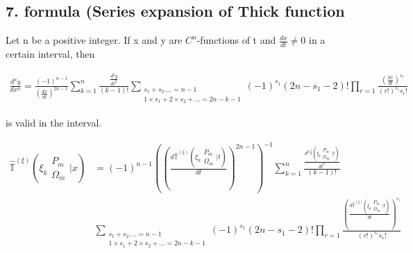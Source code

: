 \subsection{7. formula (Series expansion of Thick function}

\begin{theorem}
      Let n be a positive integer. If x and y are
      \(C^n\)-functions of t and \(\frac{dx}{dt}
      \neq 0\) in a certain interval, then
      
      \begin{align}
            \frac{d^n y}{dx^n} = \frac{(-1)^{n-1}}{(
            \frac{dx}{dt})^{2n-1}}\sum_{k=1}^n \frac{
            \frac{d^ky}{dt^k}}{(k-1)!}\sum_{\substack{
            s_1 + s_2 . ... = n-1 \\ 1\times s_1 + 2 
            \times s_2 + ... = 2n-k-1}}(-1)^{s_1}(2n-
            s_1-2)! \prod_{r=1}\frac{(\frac{dx}{dt})^{
            s_r}}{(r!)^{s_r}s_r!}
      \end{align}
      
      is valid in the interval. 
      
\end{theorem}

\begin{align}
     \hat{\mathbb{T}}^{(\xi)}\left( \xi_k \begin{matrix} 
     P_m \\ \Omega_m \end{matrix} \bigg| x  \right) &= 
     (-1)^{n-1}\left(\left(\frac{d\hat{\mathbb{T}}^{(\xi)}
     \left( \xi_k \begin{matrix} P_m \\ \Omega_m \end{matrix}
     \bigg| t  \right)}{dt}\right)^{2n-1}\right)^{-1}\sum_{k=1}^n 
     \frac{\frac{d^k\hat{\mathbb{T}}\left( \xi_k \begin{matrix}
     P_m \\ \Omega_m \end{matrix} \bigg| t  \right)}{dt^k}}{(k-1)!} \\
     &\sum_{\substack{s_1 + s_2 . ... = n-1 \\ 1\times s_1 + 2 
     \times s_2 + ... = 2n-k-1}}(-1)^{s_1}(2n-s_1-2)! 
     \prod_{r=1}\frac{(\frac{d\hat{\mathbb{T}}^{(\xi)}
     \left( \xi_k \begin{matrix} P_m \\ \Omega_m \end{matrix}
     \bigg| t  \right)}{dt})^{s_r}}{(r!)^{s_r}s_r!}
\end{align}
